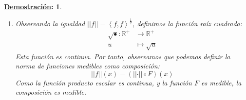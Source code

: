 \documentclass[10pt,a4paper,openright]{book}
\theoremstyle{break}
\newtheorem*{demo}{\underline{Demostración}:}
\begin{document}
\begin{demo}
\begin{enumerate}
\item Observando la igualdad $\vert \vert f \vert \vert = \left<f, f\right>^{\frac{1}{2}}$, definimos la función raíz cuadrada:
\begin{align*}
\sqrt{•}: \mathbb{R}^+ &\rightarrow \mathbb{R}^+ \\
u &\mapsto \sqrt{u}
\end{align*}
Esta función es continua. Por tanto, observamos que podemos definir la norma de funciones medibles como composición:
$$\vert \vert f \vert \vert \left( x \right) = \left( \vert \vert \cdot \vert \vert \circ F \right)\left( x \right)$$
Como la función producto escalar es continua, y la función $F$ es medible, la composición es medible.
\end{enumerate}
\end{demo}
\end{document}
